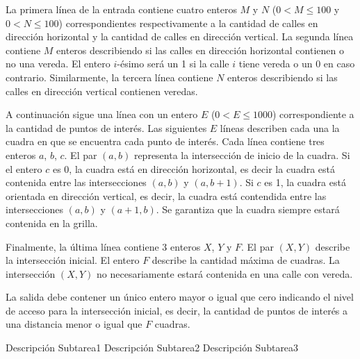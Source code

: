\documentclass{oci}
\begin{document}
\begin{inputDescription}
  La primera línea de la entrada contiene cuatro enteros $M$ y $N$ ($0 < M \leq 100$ y $0 < N\leq 100$)
  correspondientes respectivamente a la cantidad de calles en dirección horizontal y la cantidad de
  calles en dirección vertical.
  La segunda línea contiene $M$ enteros describiendo si las calles en dirección horizontal
  contienen o no una vereda.
  El entero $i$-ésimo será un 1 si la calle $i$ tiene vereda o un 0 en caso contrario.
  Similarmente, la tercera línea contiene $N$ enteros describiendo si las calles en dirección
  vertical contienen veredas.

  A continuación sigue una línea con un entero $E$ ($0 < E \leq 1000$) correspondiente a la cantidad
  de puntos de interés.
  Las siguientes $E$ líneas describen cada una la cuadra en que se encuentra cada punto de interés.
  Cada línea contiene tres enteros $a$, $b$, $c$.
  El par $(a, b)$ representa la intersección de inicio de la cuadra.
  Si el entero $c$ es 0, la cuadra está en dirección horizontal, es decir la cuadra está contenida entre las
  intersecciones $(a, b)$ y $(a, b + 1)$.
  Si $c$ es 1, la cuadra está orientada en dirección vertical, es decir, la cuadra está contendida entre
  las intersecciones $(a, b)$ y $(a + 1, b)$.
  Se garantiza que la cuadra siempre estará contenida en la grilla.

  Finalmente, la última línea contiene 3 enteros $X$, $Y$ y $F$.
  El par $(X, Y)$ describe la intersección inicial.
  El entero $F$ describe la cantidad máxima de cuadras.
  La intersección $(X, Y)$ no necesariamente estará contenida en una calle con vereda.
\end{inputDescription}

\begin{outputDescription}
  La salida debe contener un único entero mayor o igual que cero indicando el nivel de acceso para
  la intersección inicial, es decir, la cantidad de puntos de interés a una distancia menor o igual
  que $F$ cuadras.
\end{outputDescription}

\begin{scoreDescription}
  Descripción Subtarea1
  Descripción Subtarea2
  Descripción Subtarea3
\end{scoreDescription}

\begin{sampleDescription}
\end{sampleDescription}
\end{document}
